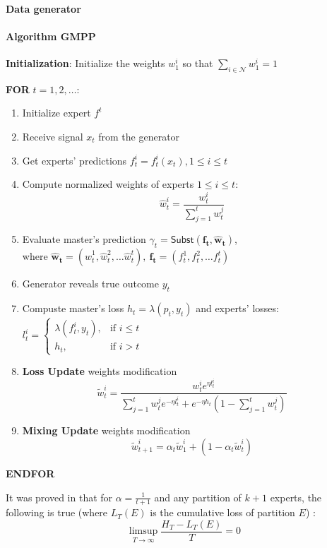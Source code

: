 \documentclass[12pt, twoside]{article}
\begin{document}
\paragraph{Data generator}
\paragraph{Algorithm GMPP}
\textbf{Initialization}: Initialize the weights $w^i_1$ so that $\sum_{i \in \mathcal{N}}w^i_1 = 1$

\textbf{FOR} $t = 1, 2, \dots$:
\begin{enumerate}[leftmargin=4em]
\item Initialize expert $f^t$
\item Receive signal $x_t$ from the generator 
\item Get experts' predictions $f_t^i = f_t^i(x_t), 1 \le i \le t$ 
\item Compute normalized weights of experts  $1 \le i \le t$: $$\widehat{w}^i_t = \dfrac{w^i_t}{\sum_{j=1}^t w_t^j}$$
\item Evaluate master's prediction $\gamma_t = \mathsf{Subst}(\mathbf{f_t}, \mathbf{\widehat{w}_t})$, \\ where $\mathbf{\widehat{w}_t} = (\widehat{w}_t^1, \widehat{w}_t^2, \dots \widehat{w}_t^t),\ \mathbf{f_t} = (f_t^1, f_t^2, \dots f_t^t)$
\item Generator reveals true outcome $y_t$
\item Compuste master's loss $h_t = \lambda(p_t, y_t) $ and experts' losses: $l_t^i =
\begin{cases}
        \lambda(f_t^i, y_t), & \text{if $i \le t$} \\
        h_t, & \text{if $i > t$}
\end{cases}$

\item \textbf{Loss Update} weights modification
\[  \widetilde{w}_t^i = \dfrac{w_t^i e^{\eta l_t^i}}{\sum\limits_{j = 1}^t w_t^j e^{-\eta l_t^i} + e^{-\eta h_t} (1 - \sum\limits_{j = 1}^t w_t^j) } \]
\item \textbf{Mixing Update} weights modification
\[  \widetilde{w}_{t+1}^i = \alpha_t\widetilde{w}_1^i + (1 - \alpha_t\widetilde{w}_t^i)\] 
\end{enumerate}

\textbf{ENDFOR}

\bigskip
It was proved in \cite{article} that for $\alpha = \frac1{t + 1}$ and any partition of $k+1$ experts, the following is true  (where $L_T(E)$ is the cumulative loss of partition $E$) :
\[ \limsup_{T \to \infty} \dfrac{H_T - L_T(E)}{T} = 0\] 
\end{document}

